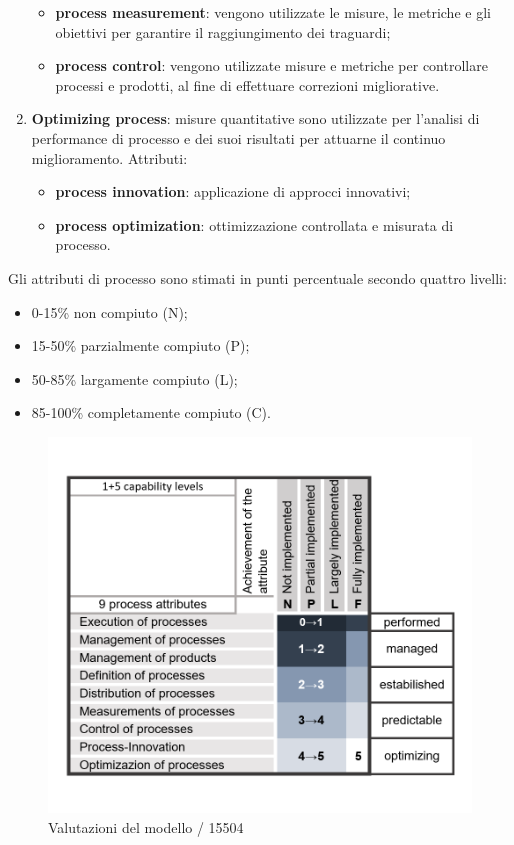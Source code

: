 \begin{enumerate}
\begin{itemize}
			\item \textbf{process measurement}: vengono utilizzate le misure, le metriche e gli obiettivi per garantire il raggiungimento dei traguardi;
			\item \textbf{process control}: vengono utilizzate misure e metriche per controllare processi e prodotti, al fine di effettuare correzioni migliorative.
		\end{itemize}
	\item \textbf{Optimizing process}: misure quantitative sono utilizzate per l'analisi di performance di processo e dei suoi risultati per attuarne il continuo miglioramento. Attributi:
		\begin{itemize}
			\item \textbf{process innovation}: applicazione di approcci innovativi;
			\item \textbf{process optimization}: ottimizzazione controllata e misurata di processo.
		\end{itemize}
\end{enumerate}
Gli attributi di processo sono stimati in punti percentuale secondo quattro livelli: 
\begin{itemize}
	\item 0-15\% non compiuto (N);
	\item 15-50\% parzialmente compiuto (P);
	\item 50-85\% largamente compiuto (L);
	\item 85-100\% completamente compiuto (C).
\end{itemize}
\begin{figure}[H]
	\centering
	\includegraphics[width=13cm]{spice.png}
	\caption{Valutazioni del modello / 15504}
\end{figure}
